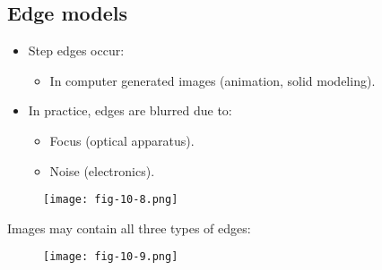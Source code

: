 %
%
%
%

\subsection{Edge models}

\begin{frame}
\begin{itemize}
\item Step edges occur:
\begin{itemize}
\item In computer generated images (animation, solid modeling).
\end{itemize}
\item In practice, edges are blurred due to:
\begin{itemize}
\item Focus (optical apparatus).
\item Noise (electronics).
\end{itemize}
\end{itemize}
\begin{figure}[!h]
\texttt{[image: fig-10-8.png]}
\end{figure}
\end{frame}

\begin{frame}
Images may contain all three types of edges:
\begin{figure}[!h]
\texttt{[image: fig-10-9.png]}
\end{figure}
\end{frame}

